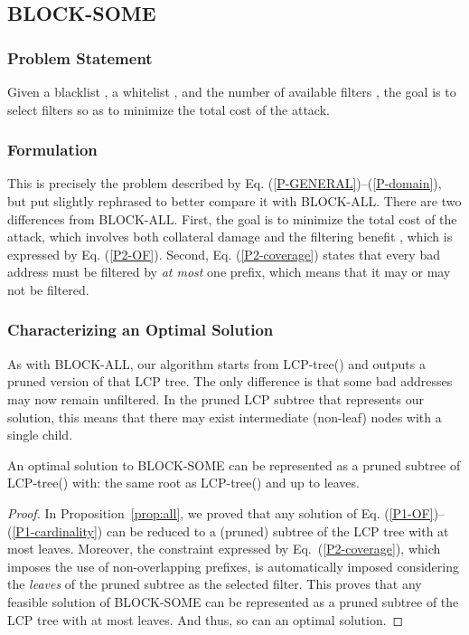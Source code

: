 \subsection{\label{sec:block-some}BLOCK-SOME}


\subsubsection*{Problem Statement}
Given a blacklist , a whitelist , and the number of available filters ,
the goal is to select filters so as to minimize the total cost of the attack.

\subsubsection*{Formulation}
This is precisely the problem described by Eq. (\ref{P-GENERAL})--(\ref{P-domain}),
but put slightly rephrased to better compare it with BLOCK-ALL.
There are two differences from BLOCK-ALL. First, the goal is to minimize the total cost of the attack, which involves
both collateral damage  and the filtering benefit , which is expressed by Eq. (\ref{P2-OF}).
Second, Eq. (\ref{P2-coverage}) states that every bad address must be filtered by {\em at most} one prefix, which means that it may or may not be filtered.





\subsubsection*{Characterizing an Optimal Solution}
As with BLOCK-ALL, our algorithm starts from LCP-tree() and outputs a pruned version of that LCP tree.
The only difference is that some bad addresses may now remain unfiltered.
In the pruned LCP subtree that represents our solution, this means that
there may exist intermediate (non-leaf) nodes with a single child.

\begin{proposition}\label{prop:some}
An optimal solution to BLOCK-SOME can be represented as a pruned subtree of
LCP-tree() with: the same root as LCP-tree() and up to  leaves.
\end{proposition}

\begin{proof}  
In Proposition~\ref{prop:all}, we proved that any solution of Eq. (\ref{P1-OF})--(\ref{P1-cardinality}) can be reduced to a (pruned)
subtree of the LCP tree with at most  leaves. Moreover, the constraint expressed by Eq.~(\ref{P2-coverage}), 
which imposes the use of non-overlapping prefixes, is automatically imposed considering the {\em leaves} of the pruned subtree as the selected filter. 
This proves that any feasible solution of BLOCK-SOME can be represented as a pruned subtree of the LCP tree with at most  leaves. 
And thus, so can an optimal solution.
\end{proof}













